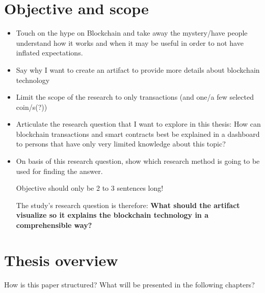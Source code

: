 \section{Objective and scope} \label{sec:Objective}
\begin{itemize}
    \item Touch on the hype on Blockchain and take away the mystery/have people understand how it works and when it may be useful in order to not have inflated expectations.
    \item Say why I want to create an artifact to provide more details about blockchain technology
    \item Limit the scope of the research to only transactions (and one/a few selected coin/s(?))
    \item Articulate the research question that I want to explore in this thesis: How can blockchain transactions and smart contracts best be explained in a dashboard to persons that have only very limited knowledge about this topic?
    \item On basis of this research question, show which research method is going to be used for finding the answer.
    
    Objective should only be 2 to 3 sentences long!
    
    The study's research question is therefore: \textbf{What should the artifact visualize so it explains the blockchain technology in a comprehensible way?}
    
\end{itemize}

\section{Thesis overview} \label{sec:ThesisOverview}
How is this paper structured? What will be presented in the following chapters?


